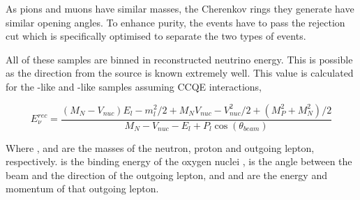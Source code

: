 As pions and muons have similar masses, the Cherenkov rings they generate have similar opening angles. To enhance purity, the events have to pass the \quickmath{\pi^{+}} rejection cut which is specifically optimised to separate the two types of events.

All of these samples are binned in reconstructed neutrino energy. This is possible as the direction from the source is known extremely well. This value is calculated for the -like and -like samples assuming CCQE interactions,

\begin{equation}
  \label{sec:SelsAndSysts_Erec_CCQE}
  E^{rec}_{\nu} = \frac{(M_{N}-V_{nuc})E_{l} - m_{l}^{2}/2 + M_{N}V_{nuc} - V_{nuc}^{2}/2 + (M_{P}^{2} + M_{N}^{2})/2}{M_{N} - V_{nuc} - E_{l} + P_{l}\cos(\theta_{beam})}
\end{equation}

Where ,  and  are the masses of the neutron, proton and outgoing lepton, respectively.  is the binding energy of the oxygen nuclei \cite{t2k_tn_399},  is the angle between the beam and the direction of the outgoing lepton, and  and  are the energy and momentum of that outgoing lepton.

